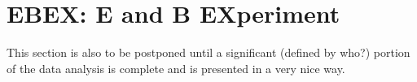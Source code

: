 \chapter{EBEX: E and B EXperiment}
\label{experiment_chapter}

This section is also to be postponed until a significant (defined by who?) portion of the data analysis is complete and is presented in a very nice way. 